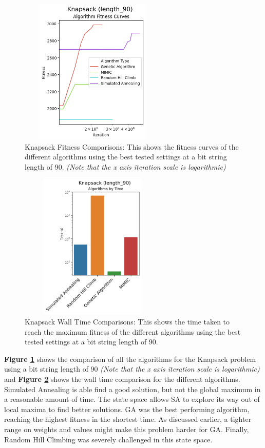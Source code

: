\documentclass[letterpaper]{article} %
\begin{document}
\begin{figure}[!htb]
\centering
\includegraphics[width=2.75in, height=2.75in]{figures/Knapsack_length_90_Algorithm_Fitness_Curves__log.png}
\caption{Knapsack Fitness Comparisons: This shows the fitness curves of the different algorithms using the best tested settings at a bit string length of 90. \emph{(Note that the x axis iteration scale is logarithmic)} }
\label{fig:knapsack_fitness_comparison_90}
\end{figure}

\begin{figure}[!htb]
\centering
\includegraphics[width=2.75in, height=2.75in]{figures/Knapsack_length_90_Algorithms_by_Time_.png}
\caption{Knapsack Wall Time Comparisons: This shows the time taken to reach the maximum fitness of the different algorithms using the best tested settings at a bit string length of 90.  }
\label{fig:knapsack_walltime_comparison_90}
\end{figure}

\textbf{Figure \ref{fig:knapsack_fitness_comparison_90}} shows the comparison of all the algorithms for the Knapsack problem using a bit string length of 90 \emph{(Note that the x axis iteration scale is logarithmic)} and \textbf{Figure \ref{fig:knapsack_walltime_comparison_90}} shows the wall time comparison for the different algorithms.  Simulated Annealing is able find a good solution, but not the global maximum in a reasonable amount of time. The state space allows SA to explore its way out of local maxima to find better solutions.  GA was the best performing algorithm, reaching the highest fitness in the shortest time.  As discussed earlier, a tighter range on weights and values might make this problem harder for GA.  Finally, Random Hill Climbing was severely challenged in this state space.  
\end{document}
